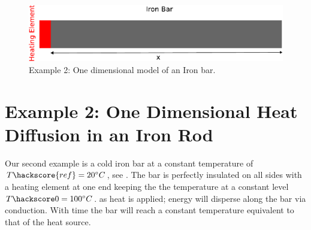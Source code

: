 
%
%
%
\begin{figure}[ht]
\centerline{\includegraphics[width=4.in]{figures/onedheatdiff002}}
\caption{Example 2: One dimensional model of an Iron bar.}
\label{fig:onedhdmodel}
\end{figure}

\section{Example 2: One Dimensional Heat Diffusion in an Iron Rod}
\label{Sec:1DHDv0}

Our second example is a cold iron bar at a constant temperature of $T\hackscore{ref}=20^{\circ} C$, see . The bar is perfectly insulated on all sides with a heating element at one end keeping the the temperature at a constant level $T\hackscore0=100^{\circ} C$.  as heat is applied; energy will disperse along the bar via conduction. With time the bar will reach a constant temperature equivalent to that of the heat source.

